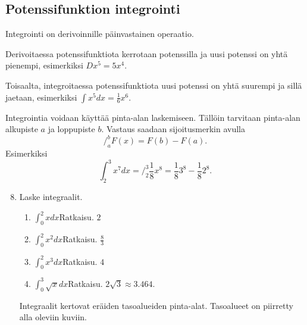 \documentclass[10pt]{article}
\newcommand{\ratkaisu}[1]{\hfill{\color{blue}\quad\textrm{Ratkaisu. } #1}}
\begin{document}
\newpage

\subsection{Potenssifunktion integrointi}

Integrointi on derivoinnille päinvastainen operaatio.

Derivoitaessa potenssifunktiota kerrotaan potenssilla ja uusi potenssi on yhtä pienempi, esimerkiksi $D x^5=5x^4$.

Toisaalta, integroitaessa potenssifunktiota uusi potenssi on yhtä suurempi ja sillä jaetaan, esimerkiksi $\int x^5dx=\frac{1}{6}x^6$.

Integrointia voidaan käyttää pinta-alan laskemiseen. Tällöin tarvitaan pinta-alan alkupiste $a$ ja loppupiste $b$. Vastaus saadaan sijoitusmerkin avulla
$$
\bigg /_a^b F(x)=F(b)-F(a).
$$
Esimerkiksi
$$
\int_2^3 x^7 dx=\bigg /_2^3 \frac{1}{8}x^8
=\frac{1}{8}3^8-\frac{1}{8}2^8.
$$

\begin{enumerate}
\setcounter{enumi}{7}
\item Laske integraalit.
\begin{enumerate}
\item $\int_0^2 xdx$\ratkaisu{$2$}
\item $\int_0^2 x^2dx$\ratkaisu{$\frac83$}
\item $\int_0^2 x^3dx$\ratkaisu{$4$}
\item $\int_0^3 \sqrt{x}dx$\ratkaisu{$2\sqrt{3}\approx 3.464.$}
\end{enumerate}
Integraalit kertovat eräiden tasoalueiden pinta-alat. Tasoalueet on piirretty alla oleviin kuviin.
\end{enumerate}

\end{document}
